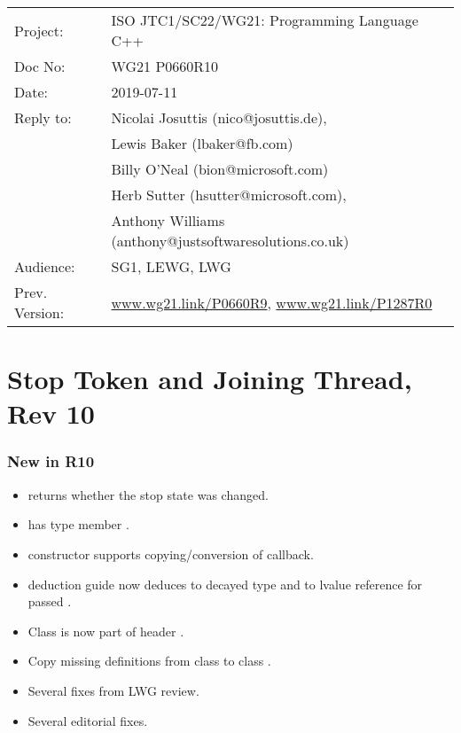 
{\small
\begin{tabular}{@{}ll}
Project:  	& ISO JTC1/SC22/WG21: Programming Language C++ \\
Doc No: 	& WG21 P0660R10 \\
Date: 		& 2019-07-11 \\
Reply to: 	& Nicolai Josuttis (nico@josuttis.de), \\
                &         Lewis Baker (lbaker@fb.com) \\
                &         Billy O'Neal (bion@microsoft.com) \\
                &         Herb Sutter (hsutter@microsoft.com), \\
                &         Anthony Williams (anthony@justsoftwaresolutions.co.uk) \\
Audience: 	& SG1, LEWG, LWG \\
Prev. Version:	& \url{www.wg21.link/P0660R9}, \url{www.wg21.link/P1287R0} \\
\end{tabular}
}

\section*{{\huge{}Stop Token and Joining Thread, Rev 10}}

\subsubsection*{New in R10}
\begin{itemize}
 \item {} returns whether the stop state was changed.
 \item {} has type member .
 \item {} constructor supports copying/conversion of callback.
 \item {} deduction guide now deduces to decayed type
       and to lvalue reference for passed .
 \item Class  is now part of header .
 \item Copy missing definitions from class  to class .
 \item Several fixes from LWG review.
 \item Several editorial fixes.
\end{itemize}

